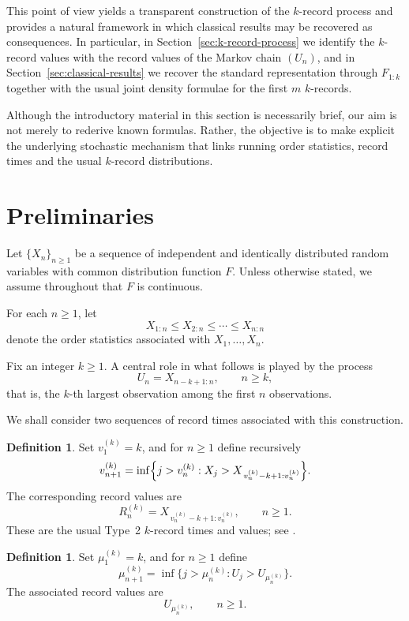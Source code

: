 \documentclass[12pt]{article}
\theoremstyle{definition}
\newtheorem{definition}[theorem]{Definition}
\begin{document}
This point of view yields a transparent construction of the $k$-record process and provides a natural framework in which classical results may be recovered as consequences. In particular, in Section~\ref{sec:k-record-process} we identify the $k$-record values with the record values of the Markov chain $(U_n)$, and in Section~\ref{sec:classical-results} we recover the standard representation through $F_{1:k}$ together with the usual joint density formulae for the first $m$ $k$-records.

Although the introductory material in this section is necessarily brief, our aim is not merely to rederive known formulas. Rather, the objective is to make explicit the underlying stochastic mechanism that links running order statistics, record times and the usual $k$-record distributions.


\section{Preliminaries}\label{sec:preliminaries}

Let $\{X_n\}_{n\ge1}$ be a sequence of independent and identically distributed random variables with common distribution function $F$. Unless otherwise stated, we assume throughout that $F$ is continuous.

For each $n\ge1$, let
\[
X_{1:n}\le X_{2:n}\le \cdots \le X_{n:n}
\]
denote the order statistics associated with $X_1,\dots,X_n$.

Fix an integer $k\ge1$. A central role in what follows is played by the process
\[
U_n=X_{n-k+1:n}, \qquad n\ge k,
\]
that is, the $k$-th largest observation among the first $n$ observations.

We shall consider two sequences of record times associated with this construction.

\begin{definition}\label{def:type2-k-record-times}
Set $v_1^{(k)}=k$, and for $n\ge1$ define recursively
\[
v_{n+1}^{(k)}
=
\inf\Bigl\{j>v_n^{(k)}:X_j>X_{\,v_n^{(k)}-k+1:v_n^{(k)}}\Bigr\}.
\]
The corresponding record values are
\[
R_n^{(k)}=X_{\,v_n^{(k)}-k+1:v_n^{(k)}}, \qquad n\ge1.
\]
These are the usual Type~2 $k$-record times and values; see \cite{ArnoldBalakrishnanNagaraja1998,AhmadiDoostparast2008}.
\end{definition}

\begin{definition}\label{def:record-times-Un}
Set $\mu_1^{(k)}=k$, and for $n\ge1$ define
\[
\mu_{n+1}^{(k)}
=
\inf\{j>\mu_n^{(k)}:U_j>U_{\mu_n^{(k)}}\}.
\]
The associated record values are
\[
U_{\mu_n^{(k)}}, \qquad n\ge1.
\]
\end{definition}
\end{document}

